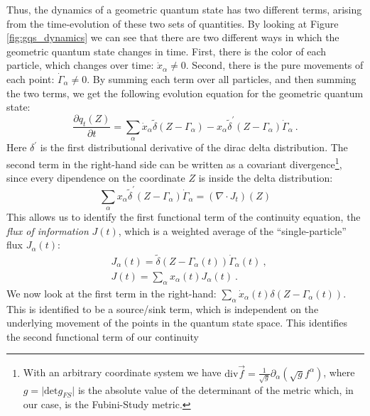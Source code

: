 \documentclass[draft,nofootinbib,pre,twocolumn,showpacs,showkeys,preprintnumbers,floatfix]{revtex4-1}
\newcommand{\1}{\mathbbm{1}}
\begin{document}
Thus, the dynamics of a geometric quantum state has two different terms, arising from the 
time-evolution of these two sets of quantities. By looking at Figure \ref{fig:gqs_dynamics}
we can see that there are two different ways in which the geometric quantum state changes 
in time. First, there is the color of each particle, which changes over time: $\dot{x}_\alpha \neq 0$. Second, there is
the pure movements of each point: $\dot{\Gamma}_\alpha \neq 0$. By summing each term over
all particles, and then summing the two terms, we get the following evolution equation for the geometric quantum state:
\begin{equation}
\frac{\partial q_t(Z)}{\partial t} = \sum_\alpha \dot{x}_\alpha \tilde{\delta}\left( Z- \Gamma_\alpha \right) - x_\alpha \widetilde{\delta}^{'}\left(Z - \Gamma_\alpha \right) \dot{\Gamma}_{\alpha}~.
\end{equation}
Here $\delta^{'}$ is the first distributional derivative of the dirac delta distribution. The second term in the
right-hand side can be written as a covariant divergence\footnote{With an arbitrary coordinate system we have $\mathrm{div} \vec{f} = \frac{1}{\sqrt{g}} \partial_\alpha \left(\sqrt{g} f^\alpha\right)$,
where $g = \vert \mathrm{det} g_{FS}\vert$ is the absolute value of the determinant of the metric which,
in our case, is the Fubini-Study metric.}, since every dipendence on the coordinate $Z$ is inside the delta distribution:
\begin{equation}
\sum_\alpha x_\alpha \widetilde{\delta}^{'}\left(Z - \Gamma_\alpha \right) \dot{\Gamma}_{\alpha} = (\nabla \cdot J_t)(Z)
\end{equation}
This allows us to identify the first functional term of the continuity equation, the \emph{flux of information} $J(t)$, which is 
a weighted average of the ``single-particle'' flux $J_\alpha(t)$:
\begin{subequations}\label{eq:flux}
\begin{align}
&J_\alpha(t) =  \widetilde{\delta}\left(Z - \Gamma_\alpha(t) \right) \dot{\Gamma}_{\alpha}(t)~,\\
&J(t) = \sum_\alpha x_\alpha(t)J_\alpha(t)~.
\end{align}
\end{subequations}
We now look at the first term in the right-hand: $\sum_\alpha \dot{x}_\alpha(t) \delta(Z-\Gamma_\alpha(t))$.
This is identified to be a source/sink term, which is independent on the underlying movement of
the points in the quantum state space. This identifies the second functional term of our continuity 
\end{document}
